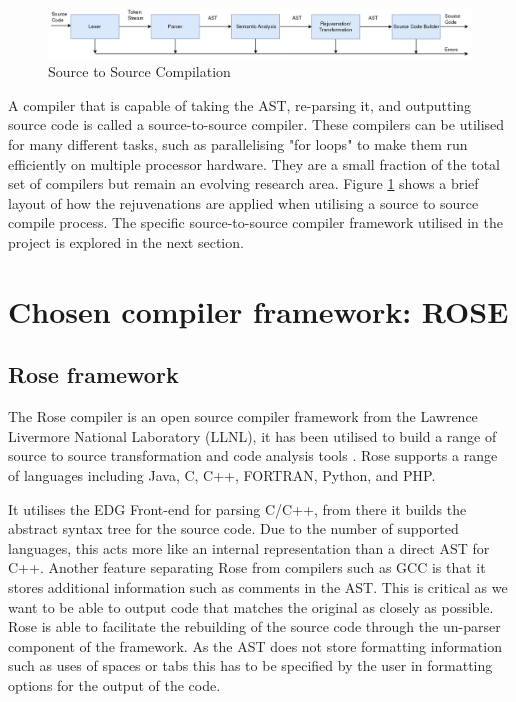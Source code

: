 \documentclass[bsc,frontabs,singlespacing,twoside,parskip,deptreport]{infthesis}
\begin{document}
\begin{figure}[!h]
    \centering
    \includegraphics[width=\textwidth]{images/Compilation-process-src.png}
    \caption{Source to Source Compilation}
    \label{fig:comp_proc_src}
\end{figure}

A compiler that is capable of taking the AST, re-parsing it, and outputting source code is called a source-to-source compiler. These compilers can be utilised for many different tasks, such as parallelising "for loops" to make them run efficiently on multiple processor hardware. They are a small fraction of the total set of compilers but remain an evolving research area. Figure \ref{fig:comp_proc_src} shows a brief layout of how the rejuvenations are applied when utilising a source to source compile process. The specific source-to-source compiler framework utilised in the project is explored in the next section.


\section{Chosen compiler framework: ROSE}
\subsection{Rose framework}
The Rose compiler \cite{ROSE} is an open source compiler framework from the Lawrence Livermore National Laboratory (LLNL), it has been utilised to build a range of source to source transformation and code analysis tools \cite{ROSE_TOOLS}. Rose supports a range of languages including Java, C, C++, FORTRAN, Python, and PHP. 

It utilises the EDG Front-end \cite{EDG} for parsing C/C++, from there it builds the abstract syntax tree for the source code. Due to the number of supported languages, this acts more like an internal representation than a direct AST for C++. Another feature separating Rose from compilers such as GCC is that it stores additional information such as comments in the AST. This is critical as we want to be able to output code that matches the original as closely as possible. Rose is able to facilitate the rebuilding of the source code through the un-parser component of the framework. As the AST does not store formatting information such as uses of spaces or tabs this has to be specified by the user in formatting options for the output of the code.
\end{document}
